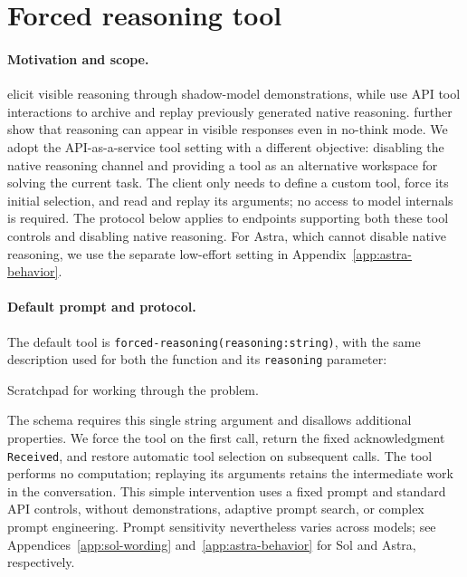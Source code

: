 \section{Forced reasoning tool}\label{app:tool_prompt}

\paragraph{Motivation and scope.}
\citet{lu2026hidden} elicit visible reasoning through shadow-model demonstrations, while \citet{qu2026echocot} use API tool interactions to archive and replay previously generated native reasoning.
\citet{wang2025hybridthinking} further show that reasoning can appear in visible responses even in no-think mode.
We adopt the API-as-a-service tool setting with a different objective: disabling the native reasoning channel and providing a tool as an alternative workspace for solving the current task.
The client only needs to define a custom tool, force its initial selection, and read and replay its arguments; no access to model internals is required.
The protocol below applies to endpoints supporting both these tool controls and disabling native reasoning.
For Astra, which cannot disable native reasoning, we use the separate low-effort setting in Appendix~\ref{app:astra-behavior}.

\paragraph{Default prompt and protocol.}
The default tool is \texttt{forced-reasoning(reasoning:string)}, with the same description used for both the function and its \texttt{reasoning} parameter:
\begin{tcolorbox}[breakable,colback=black!2,colframe=black!35,title={Default tool description},fonttitle=\bfseries,fontupper=\small\ttfamily]
Scratchpad for working through the problem.
\end{tcolorbox}

The schema requires this single string argument and disallows additional properties.
We force the tool on the first call, return the fixed acknowledgment \texttt{Received}, and restore automatic tool selection on subsequent calls.
The tool performs no computation; replaying its arguments retains the intermediate work in the conversation.
This simple intervention uses a fixed prompt and standard API controls, without demonstrations, adaptive prompt search, or complex prompt engineering.
Prompt sensitivity nevertheless varies across models; see Appendices~\ref{app:sol-wording} and~\ref{app:astra-behavior} for Sol and Astra, respectively.

